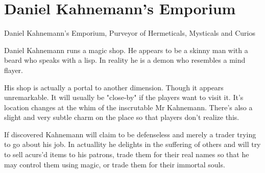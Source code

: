 \documentclass[a4paper]{dnd5}
\begin{document}
\section*{Daniel Kahnemann's Emporium}

\begin{precis}
\item Daniel Kahnemann's Emporium, Purveyor of Hermeticals, Mysticals and Curios
\item  Daniel Kahnemann runs a magic shop.  He appears to be a skinny man with a beard who speaks with a lisp.  In reality he is a demon who resembles a mind flayer.
\item  His shop is actually a portal to another dimension.  Though it appears
 unremarkable.  It will usually be "close-by" if the players want to visit it.
 It's location changes at the whim of the inscrutable Mr Kahnemann.  There's 
 also a slight and very subtle charm on the place so that players don't realize
 this.
\item  If discovered Kahnemann will claim to be defenseless and merely a trader 
 trying to go about his job.  In actuallity he delights in the suffering of 
 others and will try to sell acurs'd items to his patrons, trade them for 
 their real names so that he may control them using magic, or trade them 
 for their immortal souls.
\end{precis}

   
\begin{outs} 
\item 
\item 
\end{outs}

\begin{purpose}
\item 
\item 
\end{purpose}
     
\end{document}
